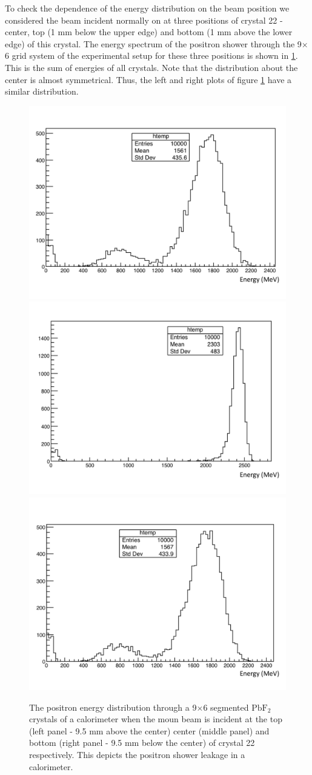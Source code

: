 \documentclass[article,accept,moreauthors,pdftex,10pt,a4paper]{../MDPI_template/Definitions/mdpi}
\begin{document}
To check the dependence of the energy distribution on the beam position we considered 
the beam incident normally on at three positions of crystal 22 - center, 
top (1 mm below the upper edge) 
and bottom (1 mm above the lower edge) of this crystal. The energy spectrum of the positron shower through 
the 9$\times$6 grid system of the experimental setup for these three positions is shown in \ref{fig3}. This 
is the sum of energies of all crystals. Note that the distribution about the center is almost symmetrical. 
Thus, the left and right plots of figure \ref{fig3} have a similar distribution. 

\begin{figure}[H]
\centering
\includegraphics[width=5 cm]{leakage_all_top.pdf}
\includegraphics[width=5 cm]{leakage_all_center.pdf}
\includegraphics[width=5 cm]{leakage_all_bottom.pdf}
\caption{\label{fig3} The positron energy distribution through a 9$\times$6 segmented $\mathrm{PbF_2}$ crystals of a 
calorimeter when the moun beam is incident at the top (left panel - 9.5 mm above the center) center (middle panel) 
and bottom (right panel - 9.5 mm below the center) of crystal 22 respectively. This depicts the positron shower leakage 
in a calorimeter.}
\end{figure}  
\end{document}

